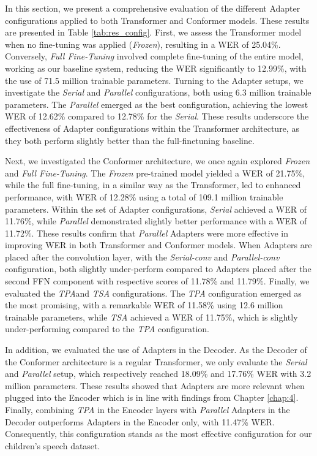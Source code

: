 In this section, we present a comprehensive evaluation of the different Adapter configurations applied to both Transformer and Conformer models. These results are presented in Table \ref{tab:res_config}. First, we assess the Transformer model when no fine-tuning was applied (\textit{Frozen}), resulting in a \ac{WER} of 25.04\%. Conversely, \textit{Full Fine-Tuning} involved complete fine-tuning of the entire model, working as our baseline system, reducing the \ac{WER} significantly to 12.99\%, with the use of 71.5 million trainable parameters.
Turning to the Adapter setups, we investigate the \textit{Serial} and \textit{Parallel} configurations, both using 6.3 million trainable parameters. The \textit{Parallel} emerged as the best configuration, achieving the lowest \ac{WER} of 12.62\% compared to 12.78\% for the \textit{Serial}. These results underscore the effectiveness of Adapter configurations within the Transformer architecture, as they both perform slightly better than the full-finetuning baseline.

Next, we investigated the Conformer architecture, we once again explored \textit{Frozen} and \textit{Full Fine-Tuning}. The \textit{Frozen} pre-trained model yielded a \ac{WER} of 21.75\%, while the full fine-tuning, in a similar way as the Transformer, led to enhanced performance, with \ac{WER} of 12.28\% using a total of 109.1 million trainable parameters. Within the set of Adapter configurations, \textit{Serial} achieved a \ac{WER} of 11.76\%, while \textit{Parallel} demonstrated slightly better performance with a \ac{WER} of 11.72\%. These results confirm that \textit{Parallel} Adapters were more effective in improving \ac{WER} in both Transformer and Conformer models. When Adapters are placed after the convolution layer, with the \textit{Serial-conv} and \textit{Parallel-conv} configuration, both slightly under-perform compared to Adapters placed after the second \ac{FFN} component with respective scores of 11.78\% and 11.79\%. Finally, we evaluated the \textit{\ac{TPA}}and \textit{\ac{TSA}} configurations. The \textit{\ac{TPA}} configuration emerged as the most promising, with a remarkable \ac{WER} of 11.58\% using 12.6 million trainable parameters, while \textit{\ac{TSA}} achieved a \ac{WER} of 11.75\%, which is slightly under-performing compared to the \textit{\ac{TPA}} configuration.

In addition, we evaluated the use of Adapters in the Decoder. As the Decoder of the Conformer architecture is a regular Transformer, we only evaluate the \textit{Serial} and \textit{Parallel} setup, which respectively reached 18.09\%  and 17.76\% \ac{WER} with 3.2 million parameters. These results showed that Adapters are more relevant when plugged into the Encoder which is in line with findings from Chapter \ref{chap:4}. Finally, combining \textit{\ac{TPA}} in the Encoder layers with \textit{Parallel} Adapters in the Decoder outperforms Adapters in the Encoder only, with 11.47\% \ac{WER}. Consequently, this configuration stands as the most effective configuration for our children's speech dataset. 


